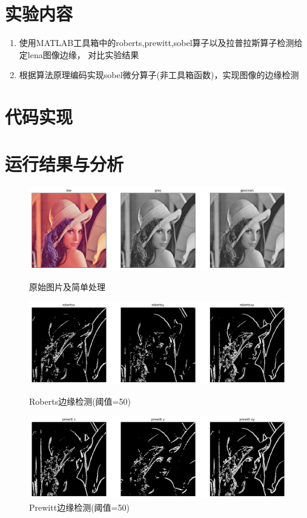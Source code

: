 \documentclass[a4paper]{ctexart}
\begin{document}
  \section{实验内容}
  \begin{enumerate}
    \item 使用MATLAB工具箱中的roberts,prewitt,sobel算子以及拉普拉斯算子检测给定lena图像边缘，
    对比实验结果
    \item 根据算法原理编码实现sobel微分算子(非工具箱函数)，实现图像的边缘检测
  \end{enumerate}

  \section{代码实现}
  

  \newpage
  \section{运行结果与分析}
  \begin{figure}[H]
    \includegraphics*[width=1.0\textwidth]{fig/raw.png}
    \caption{原始图片及简单处理}
    \includegraphics*[width=1.0\textwidth]{fig/roberts.png}
    \caption{Roberts边缘检测(阈值=50)}
    \includegraphics*[width=1.0\textwidth]{fig/prewitt.png}
    \caption{Prewitt边缘检测(阈值=50)}
  \end{figure}
\end{document}
